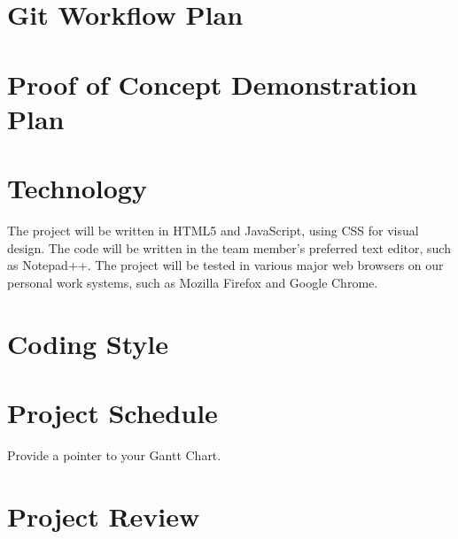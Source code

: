\documentclass{article}
\begin{document}
\section{Git Workflow Plan}

\section{Proof of Concept Demonstration Plan}

\section{Technology}
The project will be written in HTML5 and JavaScript, using CSS for visual design.  The code will be written in the team member's preferred text editor, such as Notepad++.  The project will be tested in various major web browsers on our personal work systems, such as Mozilla Firefox and Google Chrome.
\section{Coding Style}

\section{Project Schedule}

Provide a pointer to your Gantt Chart.

\section{Project Review}
\end{document}
